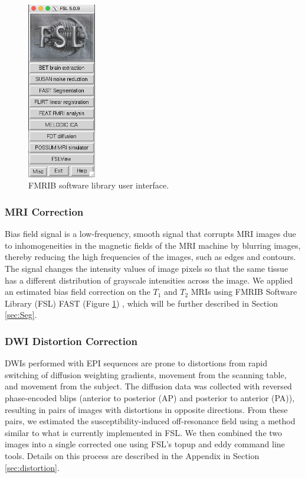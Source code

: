 \begin{figure}
    \centering
    \vspace{-63pt}
    \includegraphics[width=3cm]{Figures/FSL}
    \caption{FMRIB software library user interface.}
    \label{fig:fsl}
\end{figure}

\subsubsection{MRI Correction}

Bias field signal is a low-frequency, smooth signal that corrupts MRI images due to inhomogeneities in the magnetic fields of the MRI machine by blurring images, thereby reducing the high frequencies of the images, such as edges and contours. The signal changes the intensity values of image pixels so that the same tissue has a different distribution of grayscale intensities across the image. \cite{ref:bias} We applied an estimated bias field correction on the $T_1$ and $T_2$ MRIs using FMRIB Software Library (FSL) FAST (Figure \ref{fig:fsl}) \cite{ref:fslfast}, which will be further described in Section \ref{sec:Seg}.

\subsubsection{DWI Distortion Correction}

DWIs performed with EPI sequences are prone to distortions from rapid switching of diffusion weighting gradients, movement from the scanning table, and movement from the subject. The diffusion data was collected with reversed phase-encoded blips (anterior to posterior (AP) and posterior to anterior (PA)), resulting in pairs of images with distortions in opposite directions. From these pairs, we estimated the susceptibility-induced off-resonance field using a method \cite{ref:fsltopup1} similar to what is currently implemented in FSL.\cite{ref:fsltopup2} We then combined the two images into a single corrected one using FSL's topup and eddy command line tools. Details on this process are described in the Appendix in Section \ref{sec:distortion}.

